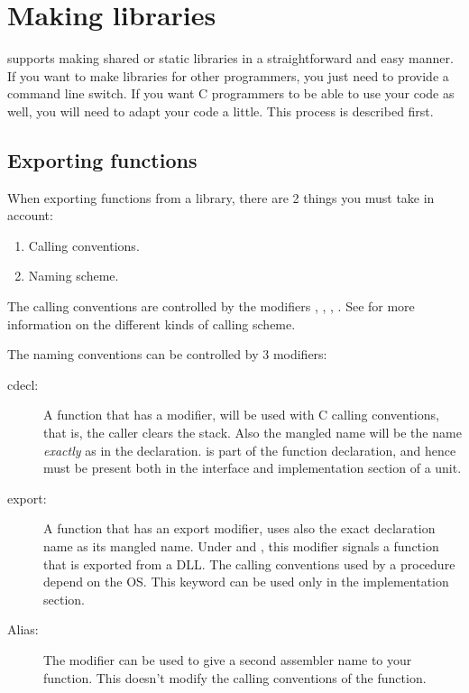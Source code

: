 \section{Making libraries}
\label{se:SharedLib}

\fpc supports making shared or static libraries in a straightforward and
easy manner.
If you want to make libraries for other \fpc programmers, you just need to
provide a command line switch. If you want C programmers to be able to use
your code as well, you will need to adapt your code a little. This process
is described first.

\subsection{Exporting functions}

When exporting functions from a library, there are 2 things you must take in
account:

\begin{enumerate}
\item Calling conventions.
\item Naming scheme.
\end{enumerate}
The calling conventions are controlled by the modifiers ,
, , . See  for more
information on the different kinds of calling scheme.

The naming conventions can be controlled by 3 modifiers:
\begin{description}
\item [cdecl:\ ] A function that has a  modifier, will be used
with C calling conventions, that is, the caller clears the stack. Also
the mangled name will be the name {\em exactly} as in the declaration.
 is part of the function declaration, and hence must be present
both in the interface and implementation section of a unit.

\item [export:\ ] A function that has an export modifier, uses also the
exact declaration name as its mangled name. Under \windowsnt and \ostwo,
this modifier signals a function that is exported from a DLL.
The calling conventions used by a  procedure depend on the OS.
This keyword can be used only in the implementation section.
\item [Alias: ] The  modifier can be used to give a second
assembler name to your function. This doesn't modify the calling conventions
of the function.
\end{description}

